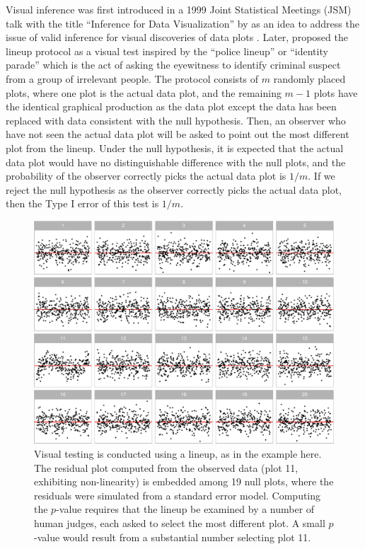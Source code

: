\documentclass[]{interact}
\theoremstyle{plain}%
\theoremstyle{definition}
\theoremstyle{remark}
\begin{document}
Visual inference was first introduced in a 1999 Joint Statistical
Meetings (JSM) talk with the title ``Inference for Data Visualization''
by \citet{buja_inference_1999} as an idea to address the issue of valid
inference for visual discoveries of data plots
\citep{gelman_exploratory_2004}. Later, \citet{buja_statistical_2009}
proposed the lineup protocol as a visual test inspired by the ``police
lineup'' or ``identity parade'' which is the act of asking the
eyewitness to identify criminal suspect from a group of irrelevant
people. The protocol consists of \(m\) randomly placed plots, where one
plot is the actual data plot, and the remaining \(m - 1\) plots have the
identical graphical production as the data plot except the data has been
replaced with data consistent with the null hypothesis. Then, an
observer who have not seen the actual data plot will be asked to point
out the most different plot from the lineup. Under the null hypothesis,
it is expected that the actual data plot would have no distinguishable
difference with the null plots, and the probability of the observer
correctly picks the actual data plot is \(1/m\). If we reject the null
hypothesis as the observer correctly picks the actual data plot, then
the Type I error of this test is \(1/m\).

\begin{figure}

{\centering \includegraphics[width=1\linewidth]{paper_comparison_files/figure-latex/first-example-lineup-1} 

}

\caption{Visual testing is conducted using a lineup, as in the example here. The residual plot computed from the observed data (plot 11, exhibiting non-linearity) is embedded among 19 null plots, where the residuals were simulated from a standard error model. Computing the $p$-value requires that the lineup be examined by a number of human judges, each asked to select the most different plot. A small $p$-value would result from a substantial number selecting plot 11.}\label{fig:first-example-lineup}
\end{figure}
\end{document}
